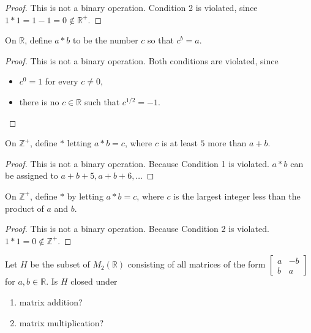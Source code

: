 \begin{proof}
    This is not a binary operation. Condition 2 is violated, since $1 * 1 = 1 - 1 = 0\notin\mathbb{R}^{+}$.
\end{proof}

\newpage
\begin{exercise}
    On $\mathbb{R}$, define $a * b$ to be the number $c$ so that $c^{b} = a$.
\end{exercise}

\begin{proof}
    This is not a binary operation. Both conditions are violated, since
    \begin{itemize}
        \item $c^{0} = 1$ for every $c\ne 0$,
        \item there is no $c\in\mathbb{R}$ such that $c^{1/2} = -1$.
    \end{itemize}
\end{proof}

\newpage
\begin{exercise}
    On $\mathbb{Z}^{+}$, define $*$ letting $a * b = c$, where $c$ is at least $5$ more than $a + b$.
\end{exercise}

\begin{proof}
    This is not a binary operation. Because Condition 1 is violated. $a * b$ can be assigned to $a + b + 5, a + b + 6, \ldots$
\end{proof}

\newpage
\begin{exercise}
    On $\mathbb{Z}^{+}$, define $*$ by letting $a * b = c$, where $c$ is the largest integer less than the product of $a$ and $b$.
\end{exercise}

\begin{proof}
    This is not a binary operation. Because Condition 2 is violated. $1 * 1 = 0\notin\mathbb{Z}^{+}$.
\end{proof}

\newpage
\begin{exercise}
    Let $H$ be the subset of $M_{2}(\mathbb{R})$ consisting of all matrices of the form $\begin{bmatrix}a & -b \\ b & a\end{bmatrix}$ for $a, b\in\mathbb{R}$. Is $H$ closed under
    \begin{enumerate}[label={\textbf{\alph*}}]
        \item matrix addition?
        \item matrix multiplication?
    \end{enumerate}
\end{exercise}

